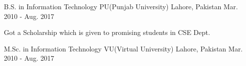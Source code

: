 

\begin{cventries}

  \cventry
    {B.S. in Information Technology} %
    {PU(Punjab University)} %
    {Lahore, Pakistan} %
    {Mar. 2010 - Aug. 2017} %
    {
      \begin{cvitems} %
        \item {Got a Scholarship which is given to promising students in CSE Dept.}
      \end{cvitems}
    }
    \cventry
    {M.Sc. in Information Technology} %
    {VU(Virtual University)} %
    {Lahore, Pakistan} %
    {Mar. 2010 - Aug. 2017} %

\end{cventries}
